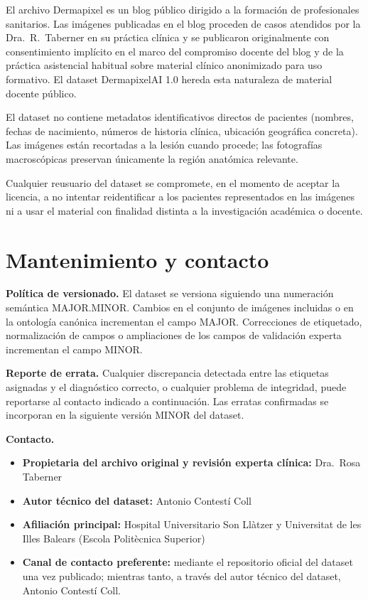 El archivo Dermapixel es un blog público dirigido a la formación
de profesionales sanitarios. Las imágenes publicadas en el blog
proceden de casos atendidos por la Dra.~R.~Taberner en su práctica
clínica y se publicaron originalmente con consentimiento implícito
en el marco del compromiso docente del blog y de la práctica
asistencial habitual sobre material clínico anonimizado para uso
formativo. El dataset DermapixelAI 1.0 hereda esta naturaleza de
material docente público.

El dataset no contiene metadatos identificativos directos de
pacientes (nombres, fechas de nacimiento, números de historia
clínica, ubicación geográfica concreta). Las imágenes están
recortadas a la lesión cuando procede; las fotografías macroscópicas
preservan únicamente la región anatómica relevante.

Cualquier reusuario del dataset se compromete, en el momento de
aceptar la licencia, a no intentar reidentificar a los pacientes
representados en las imágenes ni a usar el material con finalidad
distinta a la investigación académica o docente.

\section{Mantenimiento y contacto}
\label{sec:dataset-mantenimiento}

\textbf{Política de versionado.} El dataset se versiona siguiendo
una numeración semántica MAJOR.MINOR. Cambios en el conjunto de
imágenes incluidas o en la ontología canónica incrementan el
campo MAJOR. Correcciones de etiquetado, normalización de
campos o ampliaciones de los campos de validación experta
incrementan el campo MINOR.

\textbf{Reporte de errata.} Cualquier discrepancia detectada entre
las etiquetas asignadas y el diagnóstico correcto, o cualquier
problema de integridad, puede reportarse al contacto indicado a
continuación. Las erratas confirmadas se incorporan en la
siguiente versión MINOR del dataset.

\textbf{Contacto.}

\begin{itemize}
\item \textbf{Propietaria del archivo original y revisión experta
clínica:} Dra.~Rosa Taberner
\item \textbf{Autor técnico del dataset:} Antonio Contestí Coll
\item \textbf{Afiliación principal:} Hospital Universitario Son
Llàtzer y Universitat de les Illes Balears (Escola Politècnica
Superior)
\item \textbf{Canal de contacto preferente:} mediante el repositorio
oficial del dataset una vez publicado; mientras tanto, a través del
autor técnico del dataset, Antonio Contestí Coll.
\end{itemize}
